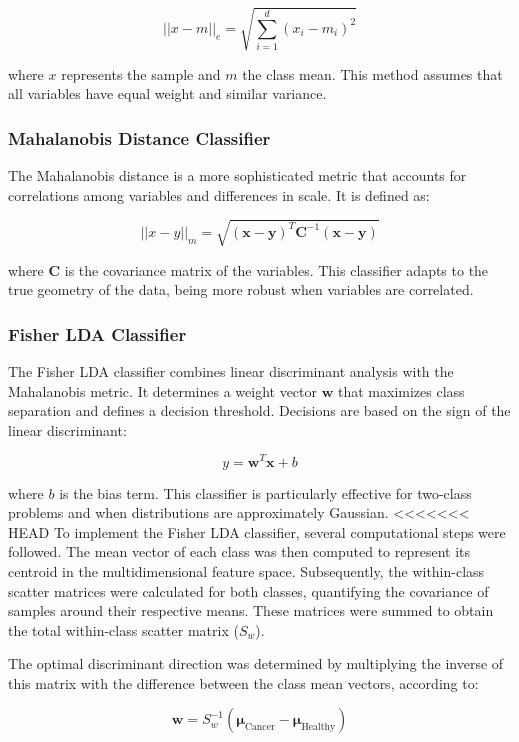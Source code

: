 \documentclass[a4paper,12pt]{article}
\begin{document}
\[
||x - m||_e = \sqrt{\sum_{i=1}^{d} (x_i - m_i)^2}
\]

where \(x\) represents the sample and \(m\) the class mean.  
This method assumes that all variables have equal weight and similar variance.

\subsubsection{Mahalanobis Distance Classifier}

The Mahalanobis distance is a more sophisticated metric that accounts for correlations among variables and differences in scale.  
It is defined as:

\[
||x - y||_m = \sqrt{(\mathbf{x} - \mathbf{y})^{T} \mathbf{C}^{-1} (\mathbf{x} - \mathbf{y})}
\]

where \(\mathbf{C}\) is the covariance matrix of the variables.  
This classifier adapts to the true geometry of the data, being more robust when variables are correlated.

\subsubsection{Fisher LDA Classifier}

The Fisher LDA classifier combines linear discriminant analysis with the Mahalanobis metric.  
It determines a weight vector \(\mathbf{w}\) that maximizes class separation and defines a decision threshold.  
Decisions are based on the sign of the linear discriminant:

\[
y = \mathbf{w}^T \mathbf{x} + b
\]

where \(b\) is the bias term.  
This classifier is particularly effective for two-class problems and when distributions are approximately Gaussian.
<<<<<<< HEAD
\noindent
To implement the Fisher LDA classifier, several computational steps were followed. The mean vector of each class was then computed to represent its centroid in the multidimensional feature space. 
Subsequently, the within-class scatter matrices were calculated for both classes, quantifying the covariance of samples around their respective means. 
These matrices were summed to obtain the total within-class scatter matrix ($S_w$).

The optimal discriminant direction was determined by multiplying the inverse of this matrix with the difference between the class mean vectors, according to:

\[
\mathbf{w} = S_w^{-1}(\boldsymbol{\mu}_{\text{Cancer}} - \boldsymbol{\mu}_{\text{Healthy}})
\]
\end{document}
